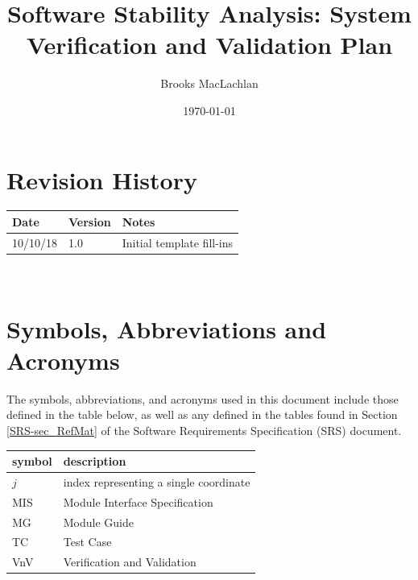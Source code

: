 \documentclass[12pt, titlepage]{article}
\begin{document}
\title{Software Stability Analysis: System Verification and Validation Plan} 
\author{Brooks MacLachlan}
\date{\today}
	
\maketitle


\section{Revision History}

\begin{tabularx}{\textwidth}{p{3cm}p{2cm}X}
\toprule {\bf Date} & {\bf Version} & {\bf Notes}\\
\midrule
10/10/18 & 1.0 & Initial template fill-ins\\
\bottomrule
\end{tabularx}

~\newpage

\section{Symbols, Abbreviations and Acronyms}
The symbols, abbreviations, and acronyms used in this document include those 
defined in the table below, as well as any defined in the tables found in 
Section \ref{SRS-sec_RefMat} of the Software Requirements Specification (SRS) 
document.
\newline

\renewcommand{\arraystretch}{1.2}
\begin{tabular}{l l} 
  \toprule		
  \textbf{symbol} & \textbf{description}\\
  \midrule 
  $j$ & index representing a single coordinate\\
  MIS & Module Interface Specification\\
  MG & Module Guide\\
  TC & Test Case\\
  VnV & Verification and Validation\\
  \bottomrule
\end{tabular}\\

\newpage

\tableofcontents

\listoftables

\listoffigures

\newpage
\end{document}
